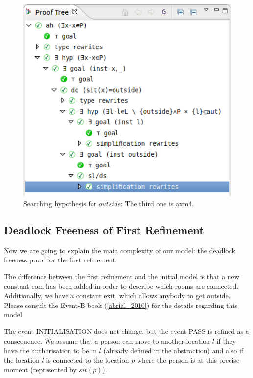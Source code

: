 \begin{figure}[!ht]
  \begin{center}
    \includegraphics{img/tutorial/tut_10_proof_tree_final.png}
    \caption{Searching hypothesis for $outside$: The third one is \textsf{axm4}.}
    \label{fig_tut_10_final_proof_tree}
  \end{center}
\end{figure}



\subsection{Deadlock Freeness of First Refinement}
\label{tut_location_first_refinement}

Now we are going to explain the main complexity of our model: the deadlock freeness proof for the first refinement. 


The difference between the first refinement and the initial model is that a new constant \textsf{com} has been added in order to describe which rooms are connected. Additionally, we have a constant \textsf{exit}, which allows anybody to get outside.  Please consult the Event-B book (\ref{abrial_2010}) for the details regarding this model.

The event \textsf{INITIALISATION} does not change, but the event \textsf{PASS} is refined as a consequence. We assume that a person can move to another location $l$ if they have the authorisation to be in $l$ (already defined in the abstraction) and also if the location $l$ is connected to the location $p$ where the person is at this precise moment (represented by $sit(p)$).

